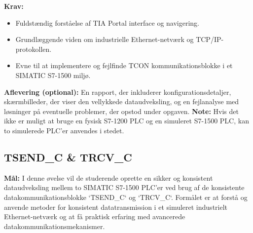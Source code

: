 \textbf{Krav:}
\begin{itemize}
	\item Fuldstændig forståelse af TIA Portal interface og navigering.
	\item Grundlæggende viden om industrielle Ethernet-netværk og TCP/IP-protokollen.
	\item Evne til at implementere og fejlfinde TCON kommunikationsblokke i et SIMATIC S7-1500 miljø.
\end{itemize}

\noindent\textbf{Aflevering (optional):} En rapport, der inkluderer konfigurationsdetaljer, skærmbilleder, der viser den vellykkede dataudveksling, og en fejlanalyse med løsninger på eventuelle problemer, der opstod under opgaven.
\newline\newline
\noindent\textbf{Note:} Hvis det ikke er muligt at bruge en fysisk S7-1200 PLC og en simuleret S7-1500 PLC, kan to simulerede PLC'er anvendes i stedet.


\subsection*{TSEND\_C \& TRCV\_C}
\label{subsec:dataudveksling_med_tsend_c_trcv_c}

\textbf{Mål:} I denne øvelse vil de studerende oprette en sikker og konsistent dataudveksling mellem to SIMATIC S7-1500 PLC'er ved brug af de konsistente datakommunikationsblokke `TSEND\_C` og `TRCV\_C`. Formålet er at forstå og anvende metoder for konsistent datatransmission i et simuleret industrielt Ethernet-netværk og at få praktisk erfaring med avancerede datakommunikationsmekanismer.

